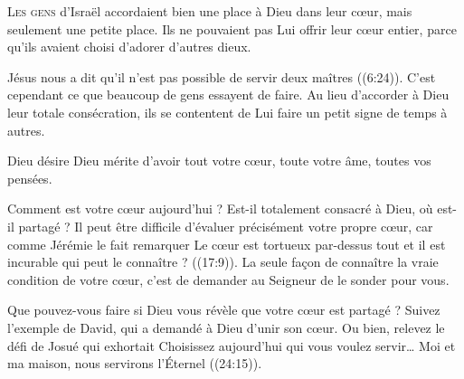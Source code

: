 

\lettrine{L}{es gens} d'Israël accordaient bien une place à Dieu
 dans leur c\oe{}ur, mais seulement une petite place.
 Ils ne pouvaient pas Lui offrir leur c\oe{}ur entier,
 parce qu'ils avaient choisi d'adorer d'autres dieux. 

Jésus nous a dit qu'il n'est pas possible de servir deux maîtres
 ((6:24)).
 C'est cependant ce que beaucoup de gens essayent de faire.
 Au lieu d'accorder à Dieu leur totale consécration,
 ils se contentent de Lui faire un petit signe de temps à autres. 


Dieu désire \ocadr Dieu mérite \fcadr{} d'avoir tout votre c\oe{}ur,
 toute votre âme, toutes vos pensées. 

Comment est votre c\oe{}ur aujourd'hui ? Est-il totalement consacré à Dieu,
 où est-il partagé ? Il peut être difficile d'évaluer précisément
 votre propre c\oe{}ur, car comme Jérémie le fait remarquer\frcolon{}
 \Og Le c\oe{}ur est tortueux par-dessus tout et il est incurable\frcolon{}
 qui peut le connaître ? \Fg{} ((17:9)).
 La seule fa\c{c}on de connaître la vraie condition de votre c\oe{}ur,
 c'est de demander au Seigneur de le sonder pour vous. 

Que pouvez-vous faire si Dieu vous révèle que votre c\oe{}ur est partagé ?
 Suivez l'exemple de David, qui a demandé à Dieu d'unir son c\oe{}ur.
 Ou bien, relevez le défi de Josué qui exhortait\frcolon{} 
 \Og Choisissez aujourd'hui qui vous voulez servir\dots{}
 Moi et ma maison, nous servirons l'Éternel  \Fg{}
 ((24:15)). 

\dvrule






